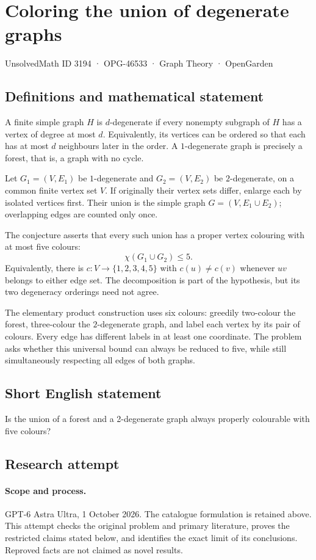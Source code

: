 \documentclass[11pt,a4paper]{article}
\begin{document}
\section*{Coloring the union of degenerate graphs}\label{3194}
{\small UnsolvedMath ID 3194 · OPG-46533 · Graph Theory · OpenGarden}
\subsection{Definitions and mathematical statement}
A finite simple graph $H$ is $d$-degenerate if every
nonempty subgraph of $H$ has a vertex of degree at
most $d$. Equivalently, its vertices can be ordered
so that each has at most $d$ neighbours later in
the order. A $1$-degenerate graph is precisely a
forest, that is, a graph with no cycle.

Let $G_1=(V,E_1)$ be $1$-degenerate and
$G_2=(V,E_2)$ be $2$-degenerate, on a common finite
vertex set $V$. If originally their vertex sets
differ, enlarge each by isolated vertices first.
Their union is the simple graph
$G=(V,E_1\cup E_2)$; overlapping edges are counted
only once.

The conjecture asserts that every such union has
a proper vertex colouring with at most five colours:
\[
 \chi(G_1\cup G_2)\leq5.
\]
Equivalently, there is $c:V\to\{1,2,3,4,5\}$
with $c(u)\neq c(v)$ whenever $uv$ belongs to
either edge set. The decomposition is part of
the hypothesis, but its two degeneracy orderings
need not agree.

The elementary product construction uses six
colours: greedily two-colour the forest, three-colour
the $2$-degenerate graph, and label each vertex
by its pair of colours. Every edge has different
labels in at least one coordinate. The problem
asks whether this universal bound can always be
reduced to five, while still simultaneously
respecting all edges of both graphs.
\subsection{Short English statement}
Is the union of a forest and a 2-degenerate graph always properly colourable with five colours?
\subsection{Research attempt}
\paragraph{Scope and process.}
GPT-6 Astra Ultra, 1 October 2026. The catalogue formulation is retained above. This attempt checks the original problem and primary literature, proves the restricted claims stated below, and identifies the exact limit of its conclusions. Reproved facts are not claimed as novel results.
\end{document}
